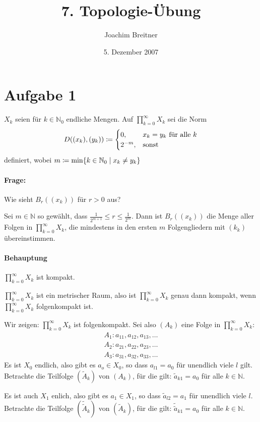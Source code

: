 \documentclass{article}
\title{7. Topologie-Übung}
\author{Joachim Breitner}
\date{5. Dezember 2007}
\begin{document}
\maketitle
\section*{Aufgabe 1}

$X_k$ seien für $k\in\mathbb N_0$ endliche Mengen. Auf $\prod_{k=0}^\infty X_k$ sei die Norm 
\[
D( (x_k), (y_k)) \mathrel{\mbox{$\coloneqq$}} 
\begin{cases}
0, &x_k =y_k \text{ für alle $k$} \\
2^{-m}, & \text{sonst}
\end{cases}
\]
definiert, wobei $m\mathrel{\mbox{$\coloneqq$}} \min \{k\in \mathbb N_0 \mid x_k \ne y_k\}$

\paragraph{Frage:} Wie sieht $B_r( (x_k))$ für $r>0$ aus?

Sei $m\in \mathbb N$ so gewählt, dass $\frac{1}{2^{m+1}} \le r\le \frac1{2^m}$. Dann ist $B_r( (x_k))$ die Menge aller Folgen in $\prod_{k=0}^\infty X_k$, die mindestens in den ersten $m$ Folgengliedern mit $(k_k)$ übereinstimmen.

\paragraph{Behauptung} $\prod_{k=0}^\infty X_k$ ist kompakt.

$\prod_{k=0}^\infty X_k$ ist ein metrischer Raum, also ist  $\prod_{k=0}^\infty X_k$ genau dann kompakt, wenn  $\prod_{k=0}^\infty X_k$ folgenkompakt ist.

Wir zeigen: $\prod_{k=0}^\infty X_k$ ist folgenkompakt. Sei also $(A_k)$ eine Folge in  $\prod_{k=0}^\infty X_k$:
\begin{align*}
A_1: a_{11}, a_{12}, a_{13}, \ldots \\
A_2: a_{21}, a_{22}, a_{23}, \ldots\\
A_3: a_{31}, a_{32}, a_{33}, \ldots
\end{align*}
Es ist $X_0$ endlich, also gibt es $a_o\in X_0$, so dass $a_{l1}=a_0$ für unendlich viele $l$ gilt. Betrachte die Teilfolge $(\tilde A_k)$ von $(A_k)$, für die gilt: $\tilde a_{k1} = a_0$ für alle $k\in\mathbb N$.

Es ist auch $X_1$ enlich, also gibt es $a_1\in X_1$, so dass $\tilde a_{l2} = a_1$ für unendlich viele $l$.  Betrachte die Teilfolge $(\tilde{\tilde A}_k)$ von $(\tilde A_k)$, für die gilt: $\tilde {\tilde a}_{k1} = a_0$ für alle $k\in\mathbb N$.
\end{document}
